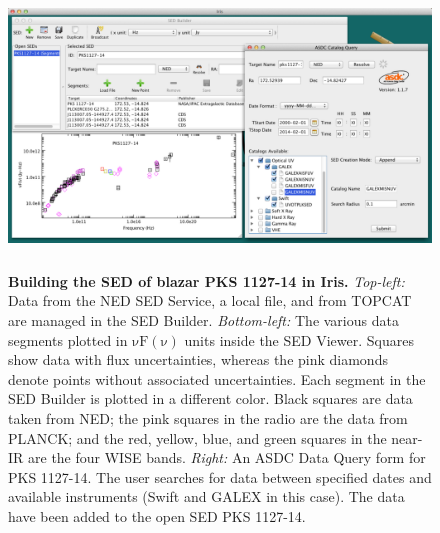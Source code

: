 \documentclass[preprint,authoryear,5p]{elsarticle}
\begin{document}
\begin{figure} \centering
\includegraphics[height=2.95in,width=5.3in]{built-in-visuals-loading.pdf}
\caption{\textbf{Building the SED of blazar PKS 1127-14 in Iris.}  
\textit{Top-left:} Data from the NED SED Service, a local file, and from TOPCAT
are managed in the SED Builder. \textit{Bottom-left:} The various data segments
plotted in $\mathrm{\nu F \left( \nu \right)}$ units inside the SED Viewer.
Squares show data with flux uncertainties, whereas the pink diamonds denote
points without associated uncertainties. Each segment in the SED Builder is
plotted in a different color. Black squares are data taken from NED; the
pink squares in the radio are the data from PLANCK; and the red, yellow, blue,
and green squares in the near-IR are the four WISE bands. \textit{Right:} An ASDC
Data Query form for PKS 1127-14. The user searches for data between specified
dates and available instruments (Swift and GALEX in this case). The data have
been added to the open SED PKS 1127-14.} \label{fig:load_data}
\end{figure}
\end{document}
